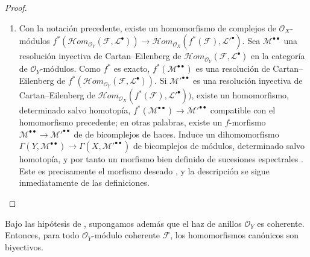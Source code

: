 \begin{proof}
\begin{enumerate}
  \item[\rm(ii)]
  Con la notación precedente, existe un homomorfismo de complejos de
  $\mathcal O_X$-módulos
  $f^*(\mathcal{H}om_{\mathcal O_Y}(\mathcal F,\mathcal L^\bullet))\longrightarrow\mathcal{H}om_{\mathcal O_X}(f^*(\mathcal F),\mathcal L'^\bullet)$.
  Sea $\mathcal M^{\bullet\bullet}$ una resolución inyectiva de
  Cartan--Eilenberg de
  $\mathcal{H}om_{\mathcal O_Y}(\mathcal F,\mathcal L^\bullet)$ en la categoría de
  $\mathcal O_Y$-módulos.  Como $f^*$ es exacto,
  $f^*(\mathcal M^{\bullet\bullet})$ es una resolución de Cartan--Eilenberg de
  $f^*(\mathcal{H}om_{\mathcal O_Y}(\mathcal F,\mathcal L^\bullet))$.
  Si $\mathcal M'^{\bullet\bullet}$ es una resolución inyectiva de
  Cartan--Eilenberg de
  $\mathcal{H}om_{\mathcal O_X}(f^*(\mathcal F),\mathcal L'^\bullet))$, existe
   un homomorfismo, determinado salvo homotopía,
  $f^*(\mathcal M^{\bullet\bullet})\longrightarrow\mathcal M'^{\bullet\bullet}$
  compatible con el homomorfismo precedente; en otras palabras, existe
  un $f$-morfismo
  $\mathcal M^{\bullet\bullet}\to
\mathcal M'^{\bullet\bullet}$ de
  de bicomplejos de haces.
  Induce un dihomomorfismo
  $\Gamma(Y,\mathcal M^{\bullet\bullet})\to
\Gamma(X,\mathcal M'^{\bullet\bullet})$
  de bicomplejos de módulos, determinado salvo homotopía, y por tanto
  un morfismo bien definido de sucesiones espectrales
  .  Este es precisamente el morfismo deseado
  , y la descripción
   se sigue inmediatamente de las definiciones.
\end{enumerate}
\end{proof}

\begin{proposition}[12.3.5]
\label{0.12.3.5}
\label{0.12.3.5-fr}
Bajo las hipótesis de , supongamos además que el
haz de anillos $\mathcal O_Y$ es coherente.
Entonces, para todo $\mathcal O_Y$-módulo coherente $\mathcal F$, los
homomorfismos canónicos  son biyectivos.
\end{proposition}

